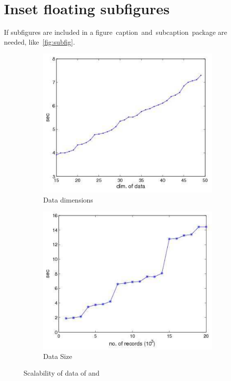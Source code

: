 \section{Inset floating subfigures}
If subfigures are included in a figure~caption~and~subcaption~package are needed, like~\ref{fig:subfig}.
\begin{figure}[htbp]
	\centering
	\begin{subfigure}[b]{0.45\textwidth}
		\centering
		\includegraphics[width=\textwidth]{figures/dataDimensions.pdf}
		\caption{Data dimensions}\label{fig:subfig:datadim}
	\end{subfigure}
	\begin{subfigure}[b]{0.45\textwidth}
		\centering
		\includegraphics[width=\textwidth]{figures/dataSize.pdf}
	\caption{Data Size}\label{fig:subfig:datasize}
	\end{subfigure}
	\caption{Scalability of data of  and }
	\vspace{\baselineskip}
\end{figure}

